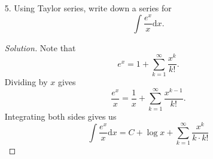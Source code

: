 \documentclass[12pt]{article}
\newcommand{\md}[1]{\left\lvert #1 \right\lvert}
\theoremstyle{definition}
\newenvironment{soln}{\begin{proof}[Solution]}{\end{proof}}
\begin{document}
\begin{itemize}
\begin{soln}
\[\begin{WithArrows}[displaystyle]
			\md{\dfrac{x^{n+1}}{(n + 1)!}} &= \md{\dfrac{x^n}{n!}}\md{\dfrac{x}{n+1}} \Arrow{$n + 1 > n > N$}\\
			&\le \md{\dfrac{x^n}{n!}}\md{\dfrac{x}{N}} \Arrow{$N > 2\md{x}$}\\
			&\le \dfrac{1}{2}\md{\dfrac{x^n}{n!}}.
		\end{WithArrows}\]
		Thus, we can repeatedly use the above to get:
		\begin{equation*} 
			\md{\dfrac{x^{n+1}}{(n + 1)!}} \le \dfrac{1}{2}\md{\dfrac{x^n}{n!}} \le \cdots \le \dfrac{1}{2^{n + 1 - N}}\md{\dfrac{x^N}{N!}}.
		\end{equation*}
		Let $s_n(x) = \displaystyle\sum_{k = 0}^{n}\dfrac{x^k}{k!}.$


		Now, given $m > n > N,$ we have
		\begin{align*} 
			\md{s_m(x) - s_n(x)} &= \md{\sum_{k = n+1}^{m}\dfrac{x^k}{k!}}\\
			&\le \sum_{k = n + 1}^{m}\md{\dfrac{x^k}{k!}}\\
			&= \md{\dfrac{x^{n + 1}}{(n + 1)!}} + \cdots + \md{\dfrac{x^m}{m!}}\\
			&\le \dfrac{\md{x}^N}{N!}\left(\dfrac{1}{2} + \cdots + \dfrac{1}{2^{m-n}}\right)\\
			&{\color{myupdatecolor}\le} \dfrac{\md{x}^N}{N!}.
		\end{align*}
		Note that given any $\epsilon > 0,$ we can pick $N \in \mathbb{N}$ such that $\dfrac{\md{x}^N}{N!} < \epsilon.$ Conclude Cauchy-ness.
	\end{soln}
	\newpage
	\item[5.] Using Taylor series, write down a series for 
	\begin{equation*} 
		\int \dfrac{e^x}{x} {\mathrm{d}}x.
	\end{equation*}
	\begin{soln}
		Note that
		\begin{equation*} 
			e^x = 1 + \sum_{k = 1}^{\infty}\dfrac{x^k}{k!}.
		\end{equation*}
		Dividing by $x$ gives
		\begin{equation*} 
			\dfrac{e^x}{x} = \dfrac{1}{x} + \sum_{k = 1}^{\infty}\dfrac{x^{k-1}}{k!}.
		\end{equation*}
		Integrating both sides gives us
		\begin{equation*} 
			\int \dfrac{e^x}{x} {\mathrm{d}}x = C + \log x + \sum_{k = 1}^{\infty}\dfrac{x^{k}}{k\cdot k!}
		\end{equation*}
	\end{soln}
\end{itemize}
%
%
%
\end{document}
